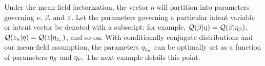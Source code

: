 
Under the mean-field factorization,
the vector $\eta$ will partition into parameters
governing $\nu$, $\beta$, and $z$. Let the parameters governing a
particular latent variable or latent vector be denoted with a subscript: for example,
$\mathcal{Q}(\beta \vert \eta) = \mathcal{Q}(\beta \vert \eta_{\beta})$,
$\mathcal{Q}(z_n \vert \eta) = \mathcal{Q}(z \vert \eta_{z_{n}})$, and so on.
With conditionally conjugate distributions and our mean-field assumption,
the parameters $\eta_{z_{n}}$ can be optimally set as a function of
parameters $\eta_{\beta}$ and $\eta_{\nu}$.
The next example details this point.


